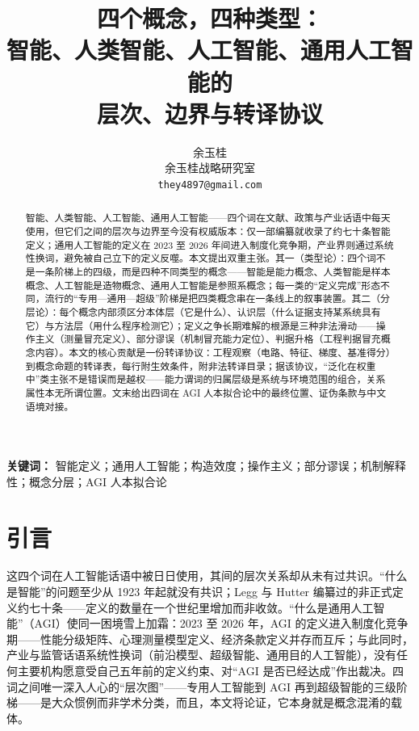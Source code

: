 \documentclass[10pt,fontset=fandol]{ctexart}
\title{\textbf{四个概念，四种类型：\\智能、人类智能、人工智能、通用人工智能的\\层次、边界与转译协议}}
\author{余玉桂\\ 余玉桂战略研究室\\ \texttt{they4897@gmail.com}}
\date{}
\begin{document}
\maketitle

\begin{abstract}
\noindent 智能、人类智能、人工智能、通用人工智能——四个词在文献、政策与产业话语中每天使用，但它们之间的层次与边界至今没有权威版本：仅一部编纂就收录了约七十条智能定义；通用人工智能的定义在 2023 至 2026 年间进入制度化竞争期，产业界则通过系统性换词，避免被自己立下的定义反噬。本文提出双重主张。其一（类型论）：四个词不是一条阶梯上的四级，而是四种不同类型的概念——智能是能力概念、人类智能是样本概念、人工智能是造物概念、通用人工智能是参照系概念；每一类的“定义完成”形态不同，流行的“专用—通用—超级”阶梯是把四类概念串在一条线上的叙事装置。其二（分层论）：每个概念内部须区分本体层（它是什么）、认识层（什么证据支持某系统具有它）与方法层（用什么程序检测它）；定义之争长期难解的根源是三种非法滑动——操作主义（测量冒充定义）、部分谬误（机制冒充能力定位）、判据升格（工程判据冒充概念内容）。本文的核心贡献是一份转译协议：工程观察（电路、特征、梯度、基准得分）到概念命题的转译表，每行附生效条件，附非法转译目录；据该协议，“泛化在权重中”类主张不是错误而是越权——能力谓词的归属层级是系统与环境范围的组合，关系属性本无所谓位置。文末给出四词在 AGI 人本拟合论中的最终位置、证伪条款与中文语境对接。
\end{abstract}

\medskip
\noindent\textbf{关键词：} 智能定义；通用人工智能；构造效度；操作主义；部分谬误；机制解释性；概念分层；AGI 人本拟合论

\section{引言}

这四个词在人工智能话语中被日日使用，其间的层次关系却从未有过共识。“什么是智能”的问题至少从 1923 年起就没有共识\cite{boring1923intelligence}；Legg 与 Hutter 编纂过的非正式定义约七十条\cite{legg2007definitions}——定义的数量在一个世纪里增加而非收敛。“什么是通用人工智能”（AGI）使同一困境雪上加霜：2023 至 2026 年，AGI 的定义进入制度化竞争期——性能分级矩阵\cite{morris2023levels}、心理测量模型定义\cite{hendrycks2025definition}、经济条款定义\cite{openai2018charter}并存而互斥；与此同时，产业与监管话语系统性换词（前沿模型、超级智能、通用目的人工智能），没有任何主要机构愿意受自己五年前的定义约束、对“AGI 是否已经达成”作出裁决。四词之间唯一深入人心的“层次图”——专用人工智能到 AGI 再到超级智能的三级阶梯——是大众惯例而非学术分类，而且，本文将论证，它本身就是概念混淆的载体。
\end{document}
